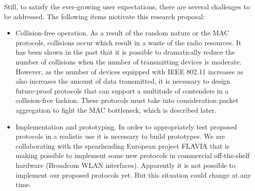 \documentclass[a4paper,twocolumns]{article}%
\begin{document}
Still, to satisfy the ever-growing user expectations, there are several challenges to be addressed.
The following items motivate this research proposal:
\begin{itemize}
\item Collision-free operation.
As a result of the random nature or the MAC protocols, collisions occur which result in a waste of the radio resources.
It has been shown in the past that it is possible to dramatically reduce the number of collisions when the number of transmitting devices is moderate.
However, as the number of devices equipped with IEEE 802.11 increases as also increases the amount of data transmitted, it is necessary to design future-proof protocols that can support a multitude of contenders in a collision-free fashion.
These protocols must take into consideration packet aggregation to fight the MAC bottleneck, which is described later.
\item Implementation and prototyping.
In order to appropriately test proposed protocols in a realistic use it is necessary to build prototypes.
We are collaborating with the spearheading European project FLAVIA that is making possible to implement some new protocols in commercial off-the-shelf hardware (Broadcom WLAN interfaces).
Apparently it is not possible to implement our proposed protocols yet.
But this situation could change at any time.


\end{itemize}
\end{document}
